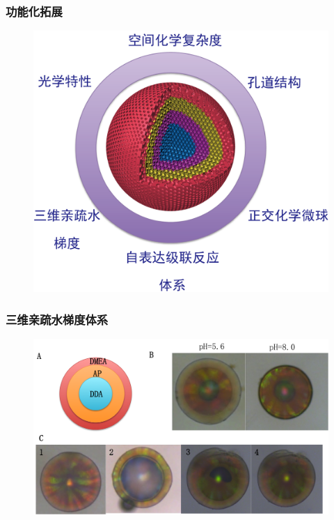 \documentclass{beamer}
\begin{document}
\begin{frame}
  \frametitle{功能化拓展}
  \begin{figure}
    \begin{center}
      \includegraphics[height=0.62\linewidth]{figures/schem3-2.png}
    \end{center}
  \end{figure}
\end{frame}


\begin{frame}
  \frametitle{三维亲疏水梯度体系}
  \begin{figure}
    \begin{center}
      \includegraphics[width=\linewidth]{figures/ch3/Figure3.png}
    \end{center}
  \end{figure}
\end{frame}
\end{document}
